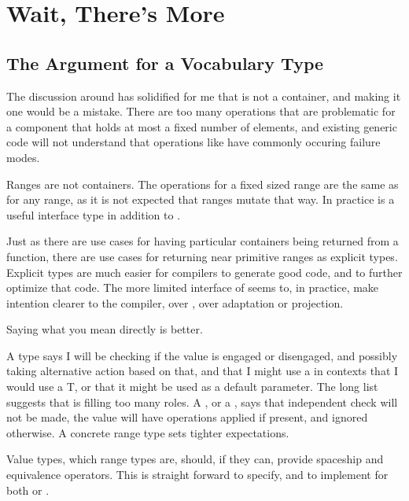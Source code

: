 \documentclass[a4paper,10pt,oneside,openany,final,article]{memoir}
\begin{document}
\chapter{Wait, There's More}

\section{The Argument for a Vocabulary Type}

The discussion around  \cite{P0843R4} has solidified for me that  is not a container, and making it one would be a mistake. There are too many operations that are problematic for a component that holds at most a fixed number of elements, and existing generic code will not understand that operations like  have commonly occuring failure modes.

Ranges are not containers. The operations for a fixed sized range are the same as for any range, as it is not expected that ranges mutate that way. In practice  is a useful interface type in addition to .

Just as there are use cases for having particular containers being returned from a function, there are use cases for returning near primitive ranges as explicit types. Explicit types are much easier for compilers to generate good code, and to further optimize that code. The more limited interface of  seems to, in practice, make intention clearer to the compiler, over , over adaptation or projection.

Saying what you mean directly is better.

A  type says I will be checking if the value is engaged or disengaged, and possibly taking alternative action based on that, and that I might use a  in contexts that I would use a T, or that it might be used as a default parameter. The long list suggests that  is filling too many roles. A , or a , says that independent check will not be made, the value will have operations applied if present, and ignored otherwise. A concrete range type sets tighter expectations.

Value types, which range types are, should, if they can, provide spaceship and equivalence operators. This is straight forward to specify, and to implement for both  or .
\end{document}
